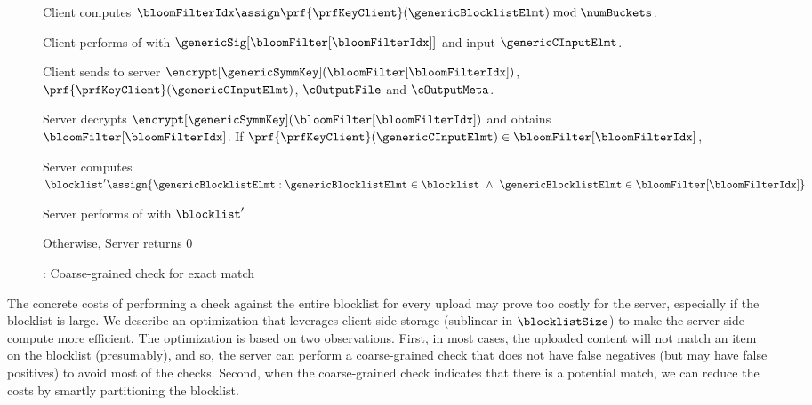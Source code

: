 \begin{figure}
\begin{mdframed}
\item Client computes $\bloomFilterIdx \assign \prf{\prfKeyClient}(\genericBlocklistElmt) \bmod \numBuckets$. 
\item Client performs  of  with $\genericSig[\bloomFilter[\bloomFilterIdx]]$ and input $\genericCInputElmt$. 
\item Client sends to server $\encrypt[\genericSymmKey](\bloomFilter[\bloomFilterIdx])$, $\prf{\prfKeyClient}(\genericCInputElmt)$, $\cOutputFile$ and $\cOutputMeta$. 
\item Server decrypts $\encrypt[\genericSymmKey](\bloomFilter[\bloomFilterIdx])$ and obtains $\bloomFilter[\bloomFilterIdx]$. If $\prf{\prfKeyClient}(\genericCInputElmt) \in \bloomFilter[\bloomFilterIdx]$, 
\enumListStart
\item Server computes $\blocklist' \assign \{ \genericBlocklistElmt: \genericBlocklistElmt \in \blocklist ~\land ~\genericBlocklistElmt \in \bloomFilter[\bloomFilterIdx] \}$
\item Server performs  of   with $\blocklist'$
\enumListEnd
\item Otherwise, Server returns $0$ 
\enumListEnd
\end{mdframed}
\caption{\protocolEMP: Coarse-grained check for exact match\label{fig:nf_pre}}
\end{figure}


The concrete costs of performing a check against the entire blocklist for every upload may prove too costly for the server, especially if the blocklist is large. We describe an optimization that leverages client-side storage (sublinear in $\blocklistSize$) to make the server-side compute more efficient. The optimization is based on two observations. 
First, in most cases, the uploaded content  will not match an item on the blocklist (presumably), and so, the server can perform a coarse-grained check that does not have false negatives (but may have false positives) to avoid most of the checks. Second, when the coarse-grained check indicates that there is a potential match, we can reduce the costs by smartly partitioning the blocklist.  


